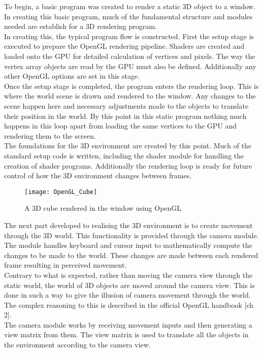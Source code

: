 \documentclass{report}
\begin{document}
To begin, a basic program was created to render a static 3D object to a window. In creating this basic program, much of the fundamental structure and modules needed
are establish for a 3D rendering program.\\
In creating this, the typical program flow is constructed. First the setup stage is executed to prepare the OpenGL rendering pipeline. Shaders are created and loaded onto
the GPU for detailed calculation of vertices and pixels. The way the vertex array objects are read by the GPU must also be defined. Additionally any other OpenGL options are set in this stage.\\
Once the setup stage is completed, the program enters the rendering loop. This is where the world scene is drawn and rendered to the window. Any changes to the scene happen here
and necessary adjustments made to the objects to translate their position in the world. By this point in this static program nothing much happens in this loop apart from loading the same vertices to the
GPU and rendering them to the screen.\\
The foundations for the 3D environment are created by this point. Much of the standard setup code is written, including the shader module for handling the creation of shader programs. Additionally the rendering loop
is ready for future control of how the 3D environment changes between frames.

\begin{figure}
\centerline{\texttt{[image: OpenGL\_Cube]}}
\caption[OpenGL Rendered Cube]{}
\centerline{A 3D cube rendered in the window using OpenGL}
\end{figure}

The next part developed to realising the 3D environment is to create movement through the 3D world. This functionality is provided through the camera 
module. The module handles keyboard and cursor input to mathematically compute the changes to be made to the world. These changes are made between each rendered
frame resulting in perceived movement.\\
Contrary to what is expected, rather than moving the camera view through the static world, the world of 3D objects are moved around the camera view. This 
is done in such a way to give the illusion of camera movement through the world. The complex reasoning to this is described in the official OpenGL handbook 
\citep{woo1999opengl}[ch 2].\\
The camera module works by receiving movement inputs and then generating a view matrix from them. The view matrix is used to translate all the objects in the 
environment according to the camera view.
\end{document}
